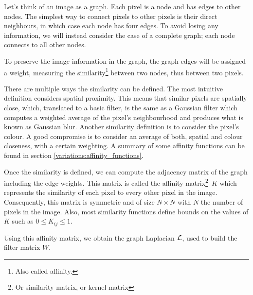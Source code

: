 Let's think of an image as a graph.
Each pixel is a node and has edges to other nodes.
The simplest way to connect pixels to other pixels is their direct neighbours, in which case each node has four edges.
To avoid losing any information, we will instead consider the case of a complete graph; each node connects to all other nodes.

To preserve the image information in the graph, the graph edges will be assigned a weight, measuring the similarity\footnote{Also called affinity.} between two nodes, thus between two pixels.

There are multiple ways the similarity can be defined.
The most intuitive definition considers spatial proximity.
This means that similar pixels are spatially close, which, translated to a basic filter, is the same as a Gaussian filter which computes a weighted average of the pixel's neighbourhood and produces what is known as Gaussian blur.
Another similarity definition is to consider the pixel's colour.
A good compromise is to consider an average of both, spatial and colour closeness, with a certain weighting.
\ifthesis
A summary of some affinity functions can be found in section \ref{variations:affinity_functions}.
\fi

Once the similarity is defined, we can compute the adjacency matrix of the graph including the edge weights.
This matrix is called the affinity matrix\footnote{Or similarity matrix, or kernel matrix}\ \(K\) which represents the similarity of each pixel to every other pixel in the image.
Consequently, this matrix is symmetric and of size \(N \times N\) with \(N\) the number of pixels in the image.
Also, most similarity functions define bounds on the values of \(K\) such as \(0 \le K_{ij} \le 1\).

Using this affinity matrix, we obtain the graph Laplacian \(\operatorname{\mathcal{L}}\), used to build the filter matrix \(W\).
